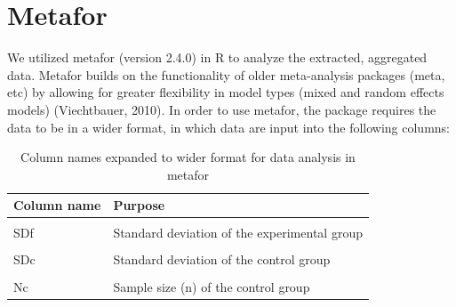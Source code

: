 \documentclass[12pt,twoside]{reedthesis}
\begin{document}
\hypertarget{metafor}{%
\section{Metafor}\label{metafor}}

We utilized metafor (version 2.4.0) in R to analyze the extracted, aggregated data. Metafor builds on the functionality of older meta-analysis packages (meta, etc) by allowing for greater flexibility in model types (mixed and random effects models) (Viechtbauer, 2010). In order to use metafor, the package requires the data to be in a wider format, in which data are input into the following columns:
\begin{table}[!h]

\caption{\label{tab:unnamed-chunk-10}Column names expanded to wider format for data analysis in metafor}
\centering
\begin{tabular}[t]{ll}
\toprule
\textbf{Column name} & \textbf{Purpose}\\
\midrule
\cellcolor{gray!6}{Mf} & \cellcolor{gray!6}{Mean of experimental group}\\
SDf & Standard deviation of the experimental group\\
\cellcolor{gray!6}{Mc} & \cellcolor{gray!6}{Mean of the control group}\\
SDc & Standard deviation of the control group\\
\cellcolor{gray!6}{Nf} & \cellcolor{gray!6}{Sample size (n) of the experimental group}\\
\addlinespace
Nc & Sample size (n) of the control group\\
\bottomrule
\end{tabular}
\end{table}
\linebreak
\end{document}
